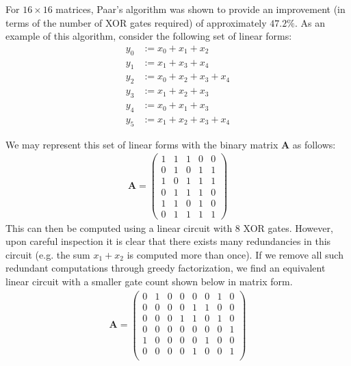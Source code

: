 For $16 \times 16$ matrices, Paar's algorithm was shown to provide an improvement (in terms of the number of XOR gates required) of approximately $47.2\%$. As an example of this algorithm, consider the following set of linear forms:
\begin{align*}
y_0 & := x_0 + x_1 + x_2 \\
y_1 & := x_1 + x_3 + x_4 \\
y_2 & := x_0 + x_2 + x_3 + x_4 \\
y_3 & := x_1 + x_2 + x_3 \\
y_4 & := x_0 + x_1 + x_3 \\
y_5 & := x_1 + x_2 + x_3 + x_4
\end{align*}

We may represent this set of linear forms with the binary matrix $\mathbf{A}$ as follows:
\begin{align*} 
\mathbf{A} = 
\begin{pmatrix}
1 & 1 & 1 & 0 & 0 \\
0 & 1 & 0 & 1 & 1 \\
1 & 0 & 1 & 1 & 1 \\
0 & 1 & 1 & 1 & 0 \\
1 & 1 & 0 & 1 & 0 \\
0 & 1 & 1 & 1 & 1
\end{pmatrix}
\end{align*}
This can then be computed using a linear circuit with $8$ XOR gates. However, upon careful inspection it is clear that there exists many redundancies in this circuit (e.g. the sum $x_1 + x_2$ is computed more than once). If we remove all such redundant computations through greedy factorization, we find an equivalent linear circuit with a smaller gate count shown below in matrix form.
\begin{align*} 
\mathbf{A} = 
\begin{pmatrix}
0 & 1 & 0 & 0 & 0 & 0 & 1 & 0 \\
0 & 0 & 0 & 0 & 1 & 1 & 0 & 0 \\
0 & 0 & 0 & 1 & 1 & 0 & 1 & 0 \\
0 & 0 & 0 & 0 & 0 & 0 & 0 & 1 \\
1 & 0 & 0 & 0 & 0 & 1 & 0 & 0 \\
0 & 0 & 0 & 0 & 1 & 0 & 0 & 1 \\
\end{pmatrix}
\end{align*}


